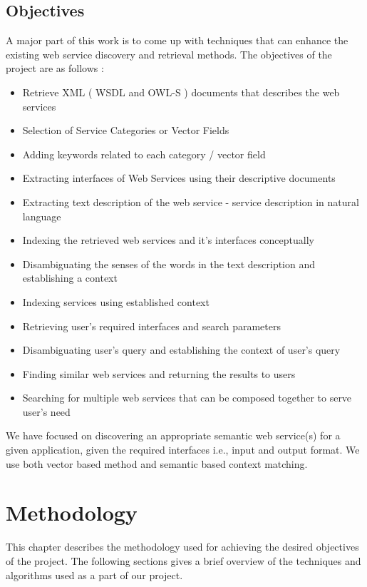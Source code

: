 \documentclass[12pt, oneside]{book}
\begin{document}
\section{Objectives}
A major part of this work is to come up with techniques that can enhance the existing web service discovery and retrieval methods. The objectives of the project are as follows :
\begin{itemize}
 \item Retrieve XML ( WSDL and OWL-S ) documents that describes the web services
 \item Selection of Service Categories or Vector Fields
 \item Adding keywords related to each category / vector field
 \item Extracting interfaces of Web Services using their descriptive documents
 \item Extracting text description of the web service - service description in natural language
 \item Indexing the retrieved web services and it's interfaces conceptually
 \item Disambiguating the senses of the words in the text description and establishing a context
 \item Indexing services using established context
 \item Retrieving user's required interfaces and search parameters
 \item Disambiguating user's query and establishing the context of user's query
 \item Finding similar web services and returning the results to users
 \item Searching for multiple web services that can be composed together to serve user's need
\end{itemize}
We have focused on discovering an appropriate semantic web service(s) for a given application, given the required interfaces i.e., input and output format. We use both vector based method and semantic based context matching. \\

\chapter{Methodology}
This chapter describes the methodology used for achieving the desired objectives of the project. The following sections gives a brief overview of the techniques and algorithms used as a part of our project.
\end{document}

